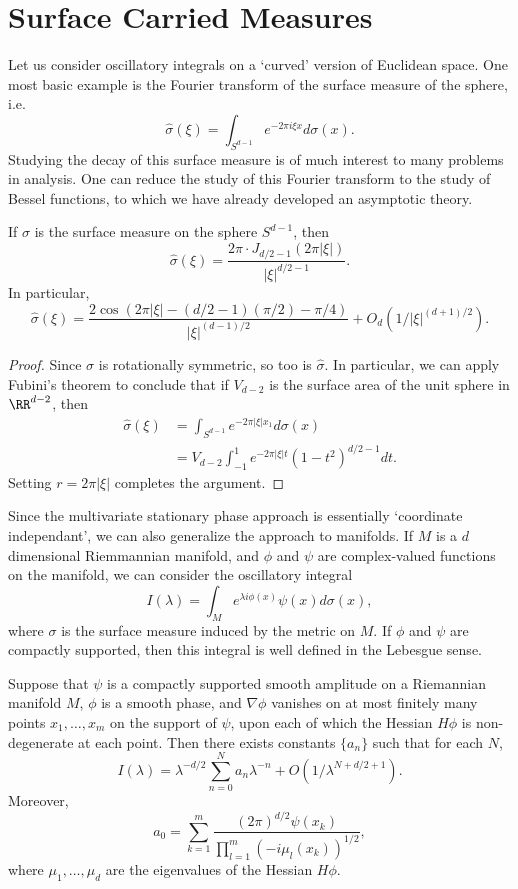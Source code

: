 \section{Surface Carried Measures}

Let us consider oscillatory integrals on a `curved' version of Euclidean space. One most basic example is the Fourier transform of the surface measure of the sphere, i.e.
%
\[ \widehat{\sigma}(\xi) = \int_{S^{d-1}} e^{-2 \pi i \xi x} d\sigma(x). \]
%
Studying the decay of this surface measure is of much interest to many problems in analysis. One can reduce the study of this Fourier transform to the study of Bessel functions, to which we have already developed an asymptotic theory.

\begin{theorem}
  If $\sigma$ is the surface measure on the sphere $S^{d-1}$, then
  \[ \widehat{\sigma}(\xi) = \frac{2\pi \cdot J_{d/2 - 1}(2 \pi |\xi|)}{|\xi|^{d/2 - 1}}. \]
  In particular,
  \[ \widehat{\sigma}(\xi) = \frac{2 \cos(2\pi |\xi| - (d/2 - 1)(\pi/2) - \pi/4)}{|\xi|^{(d-1)/2}} + O_d(1/|\xi|^{(d+1)/2}). \]
\end{theorem}
\begin{proof}
  Since $\sigma$ is rotationally symmetric, so too is $\widehat{\sigma}$. In particular, we can apply Fubini's theorem to conclude that if $V_{d-2}$ is the surface area of the unit sphere in $\RR^{d-2}$, then
  \begin{align*}
    \widehat{\sigma}(\xi) &= \int_{S^{d-1}} e^{-2 \pi |\xi| x_1} d\sigma(x)\\
    &= V_{d-2} \int_{-1}^1 e^{-2 \pi |\xi| t} (1 - t^2)^{d/2-1} dt.
  \end{align*}
  Setting $r = 2 \pi |\xi|$ completes the argument.
\end{proof}

Since the multivariate stationary phase approach is essentially `coordinate independant', we can also generalize the approach to manifolds. If $M$ is a $d$ dimensional Riemmannian manifold, and $\phi$ and $\psi$ are complex-valued functions on the manifold, we can consider the oscillatory integral
%
\[ I(\lambda) = \int_M e^{\lambda i \phi(x)} \psi(x) d\sigma(x), \]
%
where $\sigma$ is the surface measure induced by the metric on $M$. If $\phi$ and $\psi$ are compactly supported, then this integral is well defined in the Lebesgue sense.

\begin{theorem}
  Suppose that $\psi$ is a compactly supported smooth amplitude on a Riemannian manifold $M$, $\phi$ is a smooth phase, and $\nabla \phi$ vanishes on at most finitely many points $x_1, \dots, x_m$ on the support of $\psi$, upon each of which the Hessian $H\phi$ is non-degenerate at each point. Then there exists constants $\{ a_n \}$ such that for each $N$,
  \[ I(\lambda) = \lambda^{-d/2} \sum_{n = 0}^N a_n \lambda^{-n} + O(1/\lambda^{N + d/2 + 1}). \]
  Moreover,
  \[ a_0 = \sum_{k = 1}^m \frac{(2\pi)^{d/2} \psi(x_k)}{\prod_{l = 1}^m (-i \mu_l(x_k))^{1/2}}, \]
  where $\mu_1, \dots, \mu_d$ are the eigenvalues of the Hessian $H\phi$.
\end{theorem}

